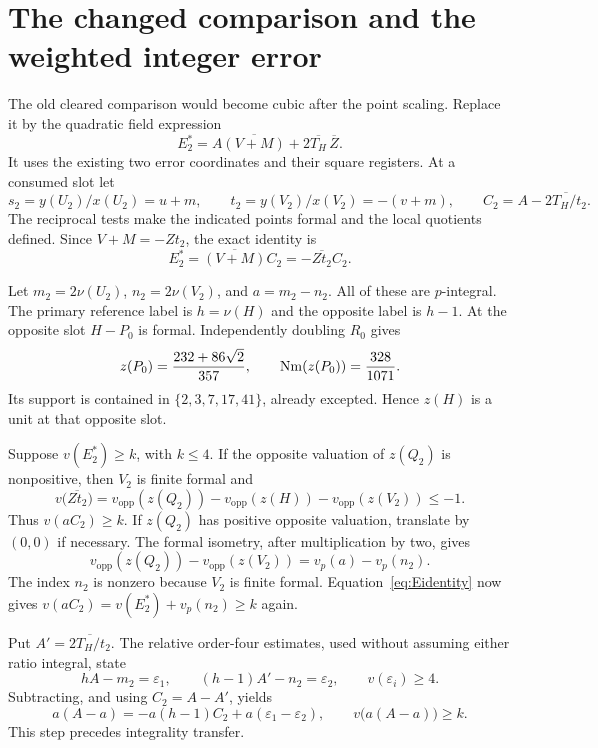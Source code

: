 \documentclass[11pt]{article}
\theoremstyle{remark}\newtheorem{remark}[theorem]{Remark}
\begin{document}
\section{The changed comparison and the weighted integer error}
The old cleared comparison would become cubic after the point
scaling. Replace it by the quadratic field expression
\begin{equation}\label{eq:Enew}
       E_2^*=A\overline{(V+M)}+2\overline{T_H}\,\overline Z.
\end{equation}
It uses the existing two error coordinates and their square
registers. At a consumed slot let
\[
 s_2=y(U_2)/x(U_2)=u+m,\qquad
 t_2=y(V_2)/x(V_2)=-(v+m),\qquad
 C_2=A-\overline{2T_H/t_2}.
\]
The reciprocal tests make the indicated points formal and the
local quotients defined. Since $V+M=-Zt_2$, the exact identity is
\begin{equation}\label{eq:Eidentity}
                  E_2^*=\overline{(V+M)}C_2
                         =-\overline{Zt_2}C_2.
\end{equation}

Let $m_2=2\nu(U_2)$, $n_2=2\nu(V_2)$, and $a=m_2-n_2$.
All of these are $p$-integral. The primary reference label is
$h=\nu(H)$ and the opposite label is $h-1$.
At the opposite slot $H-P_0$ is formal. Independently doubling
$R_0$ gives
\[
 z(P_0)=\frac{232+86\sqrt2}{357},\qquad
 \operatorname{Nm}(z(P_0))=\frac{328}{1071}.
\]
Its support is contained in $\{2,3,7,17,41\}$, already excepted.
Hence $z(H)$ is a unit at that opposite slot.

Suppose $v(E_2^*)\ge k$, with $k\le4$. If the opposite valuation
of $z(Q_2)$ is nonpositive, then $V_2$ is finite formal and
\[
 v\bigl(\overline{Zt_2}\bigr)
 =v_{\mathrm{opp}}(z(Q_2))-v_{\mathrm{opp}}(z(H))
                         -v_{\mathrm{opp}}(z(V_2))\le-1.
\]
Thus $v(aC_2)\ge k$. If $z(Q_2)$ has positive opposite
valuation, translate by $(0,0)$ if necessary. The formal
isometry, after multiplication by two, gives
\[
 v_{\mathrm{opp}}(z(Q_2))-v_{\mathrm{opp}}(z(V_2))
                         =v_p(a)-v_p(n_2).
\]
The index $n_2$ is nonzero because $V_2$ is finite formal.
Equation~\eqref{eq:Eidentity} now gives
$v(aC_2)=v(E_2^*)+v_p(n_2)\ge k$ again.

Put $A'=\overline{2T_H/t_2}$. The relative order-four estimates,
used without assuming either ratio integral, state
\[
       hA-m_2=\varepsilon_1,\qquad
       (h-1)A'-n_2=\varepsilon_2,
       \qquad v(\varepsilon_i)\ge4.
\]
Subtracting, and using $C_2=A-A'$, yields
\begin{equation}\label{eq:weighted}
 a(A-a)=-a(h-1)C_2+a(\varepsilon_1-\varepsilon_2),
 \qquad v\bigl(a(A-a)\bigr)\ge k.
\end{equation}
This step precedes integrality transfer.
\end{document}
